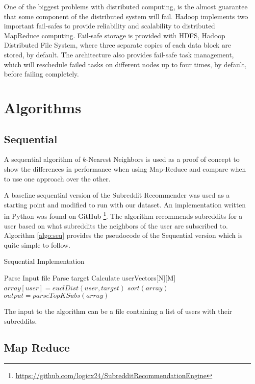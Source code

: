 \documentclass[conference, 12pt]{IEEEtran}
\begin{document}
One of the biggest problems with distributed computing, is the almost guarantee that some component of the distributed system will fail. Hadoop implements two important fail-safes to provide reliability and scalability to distributed MapReduce computing.  Fail-safe storage is provided with HDFS, Hadoop Distributed File System, where three separate copies of each data block are stored, by default.  The architecture also provides fail-safe task management, which will reschedule failed tasks on different nodes up to four times, by default, before failing completely.

\section{Algorithms}
\subsection{Sequential}
A sequential algorithm of $k$-Nearest Neighbors is used as a proof of concept to show the differences in performance when using Map-Reduce and compare when to use one approach over the other.

A baseline sequential version of the Subreddit Recommender was used as a starting point and modified to run with our dataset. An implementation written in Python was found on GitHub \footnote{\url{https://github.com/logicx24/SubredditRecommendationEngine}}.
The algorithm recommends subreddits for a user based on what subreddits the neighbors of the user are subscribed to. Algorithm \ref{algo:seq} provides the pseudocode of the Sequential version which is quite simple to follow.
\begin{algorithm}
	\small
	\caption{Sequential Implementation}
	\label{algo:seq}
	\begin{algorithmic}[1]
		\State Parse Input file
		\State Parse target
			\State Calculate userVectors[N][M]	 
				\State $array[user] = euclDist(user,target)$
			\EndFor 
			\State $sort(array)$
			\State $output = parseTopKSubs(array)$ 
		\EndFunction
	\end{algorithmic}
\end{algorithm}
The input to the algorithm can be a file containing a list of users with their subreddits.


\subsection{Map Reduce}
\end{document}
